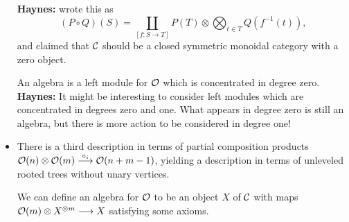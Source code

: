 \begin{LuisKoszulDuality}
\begin{itemize}
\textbf{Haynes:} wrote this as
\[(P\circ Q)(S)=
\coprod_{[f:S\to T]}P(T)\otimes\bigotimes_{t\in T}Q(f^{-1}(t)),\]
and claimed that $\mathcal{C}$ should be a closed symmetric monoidal category with a zero object.

An algebra is a left module for $\mathcal{O}$ which is concentrated in degree zero. \textbf{Haynes:} It might be interesting to consider left modules which are concentrated in degrees zero and one. What appears in degree zero is still an algebra, but there is more action to be considered in degree one!

\item There is a third description in terms of partial composition products $\mathcal{O}(n)\otimes\mathcal{O}(m)\overset{\circ_i}{\longrightarrow}\mathcal{O}(n+m-1)$, yielding a description in terms of unleveled rooted trees without unary vertices.

We can define an algebra for $\mathcal{O}$ to be an object $X$ of $\mathcal{C}$ with maps $\mathcal{O}(m)\otimes X^{\otimes m}\longrightarrow X$ satisfying some axioms.
\end{itemize}











\pagebreak
\end{LuisKoszulDuality}

